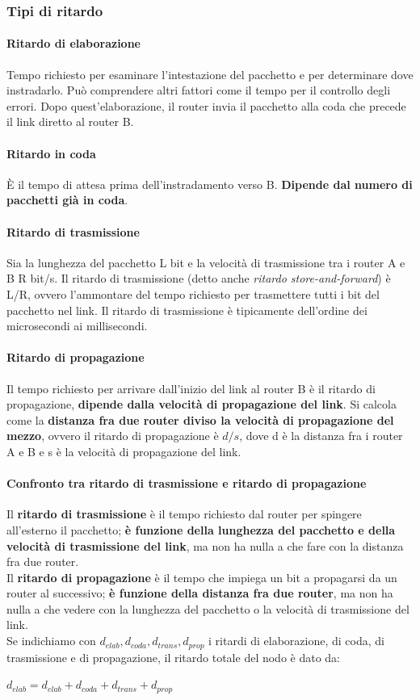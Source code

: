 \documentclass[11pt,a4paper]{article}
\begin{document}
\subsubsection{Tipi di ritardo} \label{par: ritardi}
\paragraph{Ritardo di elaborazione}
Tempo richiesto per esaminare l’intestazione del pacchetto e per determinare dove instradarlo.
Può comprendere altri fattori come il tempo per il controllo degli errori.
Dopo quest’elaborazione, il router invia il pacchetto alla coda che precede il link diretto al router B.
\paragraph{Ritardo in coda}
È il tempo di attesa prima dell’instradamento verso B. \textbf{Dipende dal numero di pacchetti già in coda}.
\paragraph{Ritardo di trasmissione}
Sia la lunghezza del pacchetto L bit e la velocità di trasmissione tra i router A e B R bit/s. Il ritardo di trasmissione (detto anche \emph{ritardo store-and-forward}) è L/R, ovvero l'ammontare del tempo richiesto per trasmettere tutti i bit del pacchetto nel link.
Il ritardo di trasmissione è tipicamente dell'ordine dei microsecondi ai millisecondi.
\paragraph{Ritardo di propagazione} 
Il tempo richiesto per arrivare dall'inizio del link al router B è il ritardo di propagazione, \textbf{dipende dalla velocità di propagazione del link}.
Si calcola come la \textbf{distanza fra due router diviso la velocità di propagazione del mezzo}, ovvero il ritardo di propagazione è $d/s$, dove d è la distanza fra i router A e B e s è la velocità di propagazione del link.
\paragraph{Confronto tra ritardo di trasmissione e ritardo di propagazione}
Il \textbf{ritardo di trasmissione} è il tempo richiesto dal router per spingere all'esterno il pacchetto; \textbf{è funzione della lunghezza del pacchetto e della velocità di trasmissione del link}, ma non ha nulla a che fare con la distanza fra due router.\\
Il \textbf{ritardo di propagazione} è il tempo che impiega un bit a propagarsi da un router al successivo; \textbf{è funzione della distanza fra due router}, ma non ha nulla a che vedere con la lunghezza del pacchetto o la velocità di trasmissione del link. \\
Se indichiamo con $d_{elab}, d_{coda}, d_{trans}, d_{prop}$ i ritardi di elaborazione, di coda, di trasmissione e di propagazione, il ritardo totale del nodo è dato da:
\begin{center}
	$d_{elab} = d_{elab} + d_{coda} + d_{trans} + d_{prop}$
\end{center}
\end{document}
